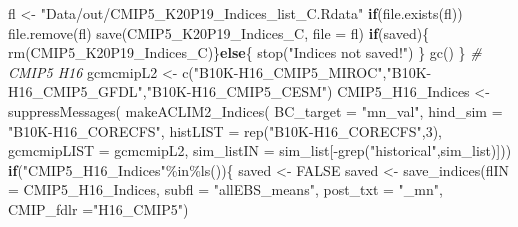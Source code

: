 \documentclass[
]{article}
\newenvironment{Shaded}{\begin{snugshade}}{\end{snugshade}}
\newcommand{\AttributeTok}[1]{\textcolor[rgb]{0.77,0.63,0.00}{#1}}
\newcommand{\CommentTok}[1]{\textcolor[rgb]{0.56,0.35,0.01}{\textit{#1}}}
\newcommand{\ConstantTok}[1]{\textcolor[rgb]{0.00,0.00,0.00}{#1}}
\newcommand{\ControlFlowTok}[1]{\textcolor[rgb]{0.13,0.29,0.53}{\textbf{#1}}}
\newcommand{\DecValTok}[1]{\textcolor[rgb]{0.00,0.00,0.81}{#1}}
\newcommand{\FunctionTok}[1]{\textcolor[rgb]{0.00,0.00,0.00}{#1}}
\newcommand{\NormalTok}[1]{#1}
\newcommand{\OtherTok}[1]{\textcolor[rgb]{0.56,0.35,0.01}{#1}}
\newcommand{\SpecialCharTok}[1]{\textcolor[rgb]{0.00,0.00,0.00}{#1}}
\newcommand{\StringTok}[1]{\textcolor[rgb]{0.31,0.60,0.02}{#1}}
\begin{document}
\begin{Shaded}
\begin{Highlighting}[]
\NormalTok{        fl }\OtherTok{\textless{}{-}} \StringTok{"Data/out/CMIP5\_K20P19\_Indices\_list\_C.Rdata"}
        \ControlFlowTok{if}\NormalTok{(}\FunctionTok{file.exists}\NormalTok{(fl)) }\FunctionTok{file.remove}\NormalTok{(fl)}
        \FunctionTok{save}\NormalTok{(CMIP5\_K20P19\_Indices\_C, }\AttributeTok{file =}\NormalTok{ fl)}
         \ControlFlowTok{if}\NormalTok{(saved)\{}
        \FunctionTok{rm}\NormalTok{(CMIP5\_K20P19\_Indices\_C)\}}\ControlFlowTok{else}\NormalTok{\{}
          \FunctionTok{stop}\NormalTok{(}\StringTok{"Indices not saved!"}\NormalTok{)}
\NormalTok{        \}}
        \FunctionTok{gc}\NormalTok{()}
\NormalTok{    \}}
    \CommentTok{\# CMIP5 H16}
\NormalTok{    gcmcmipL2 }\OtherTok{\textless{}{-}} \FunctionTok{c}\NormalTok{(}\StringTok{"B10K{-}H16\_CMIP5\_MIROC"}\NormalTok{,}\StringTok{"B10K{-}H16\_CMIP5\_GFDL"}\NormalTok{,}\StringTok{"B10K{-}H16\_CMIP5\_CESM"}\NormalTok{) }
\NormalTok{    CMIP5\_H16\_Indices }\OtherTok{\textless{}{-}} \FunctionTok{suppressMessages}\NormalTok{(}
                        \FunctionTok{makeACLIM2\_Indices}\NormalTok{(}
                        \AttributeTok{BC\_target =} \StringTok{"mn\_val"}\NormalTok{,}
                        \AttributeTok{hind\_sim  =}  \StringTok{"B10K{-}H16\_CORECFS"}\NormalTok{,}
                        \AttributeTok{histLIST  =} \FunctionTok{rep}\NormalTok{(}\StringTok{"B10K{-}H16\_CORECFS"}\NormalTok{,}\DecValTok{3}\NormalTok{),}
                        \AttributeTok{gcmcmipLIST =}\NormalTok{ gcmcmipL2,}
                        \AttributeTok{sim\_listIN =}\NormalTok{ sim\_list[}\SpecialCharTok{{-}}\FunctionTok{grep}\NormalTok{(}\StringTok{"historical"}\NormalTok{,sim\_list)]))}
    \ControlFlowTok{if}\NormalTok{(}\StringTok{"CMIP5\_H16\_Indices"}\SpecialCharTok{\%in\%}\FunctionTok{ls}\NormalTok{())\{}
\NormalTok{      saved }\OtherTok{\textless{}{-}} \ConstantTok{FALSE}
\NormalTok{      saved }\OtherTok{\textless{}{-}} \FunctionTok{save\_indices}\NormalTok{(}\AttributeTok{flIN =}\NormalTok{ CMIP5\_H16\_Indices, }
                   \AttributeTok{subfl =} \StringTok{"allEBS\_means"}\NormalTok{,}
                   \AttributeTok{post\_txt =} \StringTok{"\_mn"}\NormalTok{,}
                   \AttributeTok{CMIP\_fdlr =}\StringTok{"H16\_CMIP5"}\NormalTok{)}
     

\end{Highlighting}
\end{Shaded}
\end{document}
